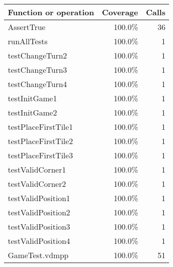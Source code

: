 \begin{longtable}{|l|r|r|}
\hline
Function or operation & Coverage & Calls \\
\hline
\hline
AssertTrue & 100.0\% & 36 \\
\hline
runAllTests & 100.0\% & 1 \\
\hline
testChangeTurn2 & 100.0\% & 1 \\
\hline
testChangeTurn3 & 100.0\% & 1 \\
\hline
testChangeTurn4 & 100.0\% & 1 \\
\hline
testInitGame1 & 100.0\% & 1 \\
\hline
testInitGame2 & 100.0\% & 1 \\
\hline
testPlaceFirstTile1 & 100.0\% & 1 \\
\hline
testPlaceFirstTile2 & 100.0\% & 1 \\
\hline
testPlaceFirstTile3 & 100.0\% & 1 \\
\hline
testValidCorner1 & 100.0\% & 1 \\
\hline
testValidCorner2 & 100.0\% & 1 \\
\hline
testValidPosition1 & 100.0\% & 1 \\
\hline
testValidPosition2 & 100.0\% & 1 \\
\hline
testValidPosition3 & 100.0\% & 1 \\
\hline
testValidPosition4 & 100.0\% & 1 \\
\hline
\hline
GameTest.vdmpp & 100.0\% & 51 \\
\hline
\end{longtable}

